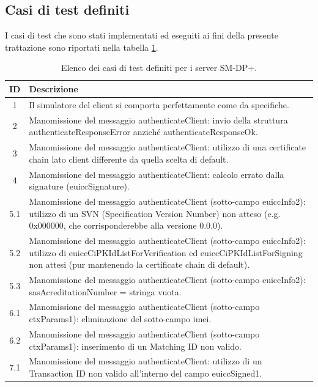 \documentclass[10pt, oneside]{book}
\begin{document}
\subsection{Casi di test definiti}
I casi di test che sono stati implementati ed eseguiti ai fini della presente trattazione sono riportati nella tabella \ref{tab:test-cases}.\\
\begin{table}[h!]
\begin{center}
\captionsetup{skip=4pt}
\caption{Elenco dei casi di test definiti per i server SM-DP+.}
\label{tab:test-cases}
\begin{tabularx}{\textwidth}{|c|X|} %
\hline
\textbf{ID} & \textbf{Descrizione}\\
\hline
1 & Il simulatore del client si comporta perfettamente come da specifiche.\\
\hline
2 & Manomissione del messaggio authenticateClient: invio della struttura authenticateResponseError anziché authenticateResponseOk.\\
\hline
3 & Manomissione del messaggio authenticateClient: utilizzo di una certificate chain lato client differente da quella scelta di default.\\
\hline
4 & Manomissione del messaggio authenticateClient: calcolo errato dalla signature (euiccSignature).\\
\hline
5.1 & Manomissione del messaggio authenticateClient (sotto-campo euiccInfo2): utilizzo di un SVN (Specification Version Number) non atteso (e.g. 0x000000, che corrisponderebbe alla versione 0.0.0).\\
\hline
5.2 & Manomissione del messaggio authenticateClient (sotto-campo euiccInfo2): utilizzo di euiccCiPKIdListForVerification ed euiccCiPKIdListForSigning non attesi (pur mantenendo la certificate chain di default).\\
\hline
5.3 & Manomissione del messaggio authenticateClient (sotto-campo euiccInfo2): sasAcreditationNumber = stringa vuota.\\
\hline
6.1 & Manomissione del messaggio authenticateClient (sotto-campo ctxParams1): eliminazione del sotto-campo imei.\\
\hline
6.2 & Manomissione del messaggio authenticateClient (sotto-campo ctxParams1): inserimento di un Matching ID non valido.\\
\hline
7.1 & Manomissione del messaggio authenticateClient: utilizzo di un Transaction ID non valido all'interno del campo euiccSigned1.\\

\end{tabularx}
\end{center}
\end{table}
\end{document}
